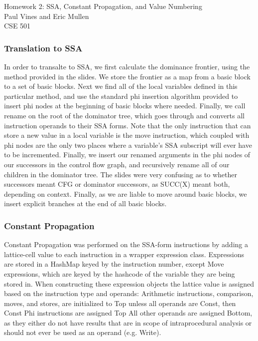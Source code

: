\documentclass[12pt,letterpaper]{article}
\begin{document}
\begin{flushright}
Homework 2: SSA, Constant Propagation, and Value Numbering\\
Paul Vines and Eric Mullen\\
CSE 501\\
\end{flushright}
\subsubsection*{Translation to SSA}
In order to transalte to SSA, we first calculate the dominance
frontier, using the method provided in the slides. We store the
frontier as a map from a basic block to a set of basic blocks. Next we
find all of the local variables defined in this particular method, and
use the standard phi insertion algorithm provided to insert phi nodes
at the beginning of basic blocks where needed. Finally, we call rename
on the root of the dominator tree, which goes through and converts all
instruction operands to their SSA forms. Note that the only
instruction that can store a new value in a local variable is the move
instruction, which coupled with phi nodes are the only two places
where a variable's SSA subscript will ever have to be
incremented. Finally, we insert our renamed arguments in the phi nodes
of our successors in the control flow graph, and recursively rename
all of our children in the dominator tree. The slides were very
confusing as to whether successors meant CFG or dominator successors,
as SUCC(X) meant both, depending on context. Finally, as we are liable
to move around basic blocks, we insert explicit branches at the end of
all basic blocks.

\subsubsection*{Constant Propagation}
Constant Propagation was performed on the SSA-form instructions by
adding a lattice-cell value to each instruction in a wrapper
expression class. Expressions are stored in a HashMap keyed by the
instruction number, except Move expressions, which are keyed by the
hashcode of the variable they are being stored in. When constructing
these expression objects the lattice value is assigned based on the
instruction type and operands: Arithmetic instructions, comparison,
moves, and stores, are initialized to Top unless all operands are
Const, then Const Phi instructions are assigned Top All other operands
are assigned Bottom, as they either do not have results that are in
scope of intraprocedural analysis or should not ever be used as an
operand (e.g. Write).
\end{document}
